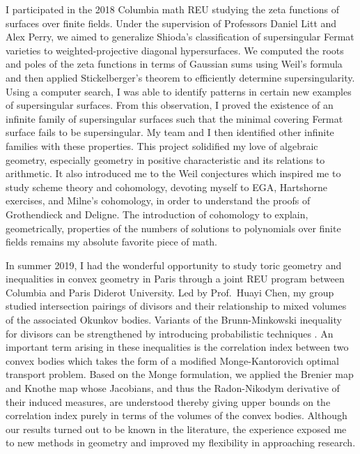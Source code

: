 \documentclass[11pt]{article}
\begin{document}
I participated in the 2018 Columbia math REU studying the zeta functions of surfaces over finite fields. Under the supervision of Professors Daniel Litt and Alex Perry, we aimed to generalize Shioda’s classification of supersingular Fermat varieties  to weighted-projective diagonal hypersurfaces. We computed the roots and poles of the zeta functions in terms of Gaussian sums using Weil's formula and then applied Stickelberger's theorem to efficiently determine supersingularity. Using a computer search, I was able to identify patterns in certain new examples of supersingular surfaces. From this observation, I proved the existence of an infinite family of supersingular surfaces such that the minimal covering Fermat surface fails to be supersingular. My team and I then identified other infinite families with these properties. This project solidified my love of algebraic geometry, especially geometry in positive characteristic and its relations to arithmetic. It also introduced me to the Weil conjectures which inspired me to study scheme theory and \etale cohomology, devoting myself to EGA, Hartshorne exercises, and Milne's \etale cohomology, in order to understand the proofs of Grothendieck and Deligne. The introduction of \etale cohomology to explain, geometrically, properties of the numbers of solutions to polynomials over finite fields remains my absolute favorite piece of math. 
\par
In summer 2019, I had the wonderful opportunity to study toric geometry and inequalities in convex geometry in Paris through a joint REU program between Columbia and Paris Diderot University. Led by Prof.\ Huayi Chen, my group studied intersection pairings of divisors and their relationship to mixed volumes of the associated Okunkov bodies. Variants of the Brunn-Minkowski inequality for divisors can be strengthened by introducing probabilistic techniques .
An important term arising in these inequalities is the correlation index between two convex bodies which takes the form of a modified Monge-Kantorovich optimal transport problem. Based on the Monge formulation, we applied the Brenier map and Knothe map whose Jacobians, and thus the Radon-Nikodym derivative of their induced measures, are understood thereby giving upper bounds on the correlation index purely in terms of the volumes of the convex bodies. Although our results turned out to be known in the literature, the experience exposed me to new methods in geometry and improved my flexibility in approaching research.
\end{document}

